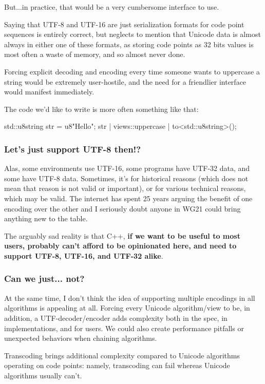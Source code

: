 \documentclass{wg21}
\begin{document}
But...in practice, that would be a very cumbersome interface to use.

Saying that UTF-8 and UTF-16 are just serialization formats for code point sequences is entirely correct, but neglects to mention that Unicode data
is almost always in either one of these formats, as storing code points as 32 bits values is most often a waste of memory, and so almost never done.

Forcing explicit decoding and encoding every time someone wants to uppercase a string would be extremely user-hostile, and the need for a friendlier  interface would manifest immediately.

The code we'd like to write is more often something like that:

\begin{colorblock}
std::u8string str = u8"Hello";
str | views::uppercase | to<std::u8string>();
\end{colorblock}

\subsubsection{Let's just support UTF-8 then!?}

Alas, some environments use UTF-16, some programs have UTF-32 data, and some have UTF-8 data.
Sometimes, it's for historical reasons (which does not mean that reason is not valid or important), or for various technical reasons, which may be valid.
The internet has spent 25 years arguing the benefit of one encoding over the other and I seriously doubt anyone in WG21 could bring anything new to the table.

The arguably sad reality is that C++, \textbf{if we want to be useful to most users, probably can't afford to be opinionated here, and need to support UTF-8, UTF-16, and UTF-32 alike}.

\subsubsection{Can we just... not?}

At the same time, I don't think the idea of supporting multiple encodings in all algorithms is appealing at all.
Forcing every Unicode algorithm/view to be, in addition, a UTF-decoder/encoder adds complexity both in the spec, in implementations, and for users.
We could also create performance pitfalls or unexpected behaviors when chaining algorithms.

Transcoding brings additional complexity compared to Unicode algorithms operating on code points:
namely, transcoding can fail whereas Unicode algorithms usually can't.
\end{document}
